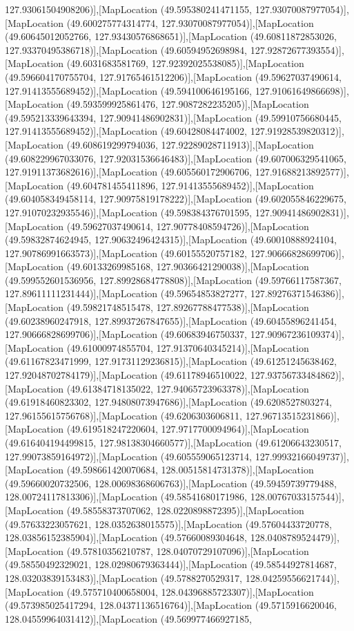 127.93061504908206)],[MapLocation (49.595380241471155, 127.93070087977054)],[MapLocation (49.600275774314774, 127.93070087977054)],[MapLocation (49.60645012052766, 127.93430576868651)],[MapLocation (49.60811872853026, 127.93370495386718)],[MapLocation (49.60594952698984, 127.92872677393554)],[MapLocation (49.6031683581769, 127.92392025538085)],[MapLocation (49.596604170755704, 127.91765461512206)],[MapLocation (49.59627037490614, 127.91413555689452)],[MapLocation (49.594100646195166, 127.91061649866698)],[MapLocation (49.593599925861476, 127.9087282235205)],[MapLocation (49.595213339643394, 127.90941486902831)],[MapLocation (49.59910756680445, 127.91413555689452)],[MapLocation (49.60428084474002, 127.91928539820312)],[MapLocation (49.608619299794036, 127.92289028711913)],[MapLocation (49.608229967033076, 127.92031536646483)],[MapLocation (49.607006329541065, 127.91911373682616)],[MapLocation (49.605560172906706, 127.91688213892577)],[MapLocation (49.604781455411896, 127.91413555689452)],[MapLocation (49.604058349458114, 127.90975819178222)],[MapLocation (49.602055846229675, 127.91070232935546)],[MapLocation (49.598384376701595, 127.90941486902831)],[MapLocation (49.59627037490614, 127.90778408594726)],[MapLocation (49.59832874624945, 127.90632496424315)],[MapLocation (49.60010888924104, 127.90786991663573)],[MapLocation (49.60155520757182, 127.90666828699706)],[MapLocation (49.60133269985168, 127.90366421290038)],[MapLocation (49.599552601536956, 127.89928684778808)],[MapLocation (49.59766117587367, 127.89611111231444)],[MapLocation (49.59654853827277, 127.89276371546386)],[MapLocation (49.59821748515478, 127.89267788477538)],[MapLocation (49.60238960247918, 127.89937267847655)],[MapLocation (49.60455896241454, 127.90666828699706)],[MapLocation (49.60683946750337, 127.90967236109374)],[MapLocation (49.61000974855704, 127.91370640345214)],[MapLocation (49.61167823471999, 127.91731129236815)],[MapLocation (49.61251245638462, 127.92048702784179)],[MapLocation (49.61178946510022, 127.93756733484862)],[MapLocation (49.61384718135022, 127.94065723963378)],[MapLocation (49.61918460823302, 127.94808073947686)],[MapLocation (49.6208527803274, 127.96155615756768)],[MapLocation (49.6206303606811, 127.96713515231866)],[MapLocation (49.619518247220604, 127.9717700094964)],[MapLocation (49.616404194499815, 127.98138304660577)],[MapLocation (49.61206643230517, 127.99073859164972)],[MapLocation (49.605559065123714, 127.99932166049737)],[MapLocation (49.598661420070684, 128.00515814731378)],[MapLocation (49.59660020732506, 128.00698368606763)],[MapLocation (49.59459739779488, 128.00724117813306)],[MapLocation (49.58541680171986, 128.00767033157544)],[MapLocation (49.58558373707062, 128.0220898872395)],[MapLocation (49.57633223057621, 128.0352638015575)],[MapLocation (49.57604433720778, 128.03856152385904)],[MapLocation (49.57660089304648, 128.0408789524479)],[MapLocation (49.57810356210787, 128.04070729107096)],[MapLocation (49.58550492329021, 128.02980679363444)],[MapLocation (49.58544927814687, 128.03203839153483)],[MapLocation (49.5788270529317, 128.04259556621744)],[MapLocation (49.575710400658004, 128.04396885723307)],[MapLocation (49.573985025417294, 128.04371136516764)],[MapLocation (49.5715916620046, 128.04559964031412)],[MapLocation (49.569977466927185, 